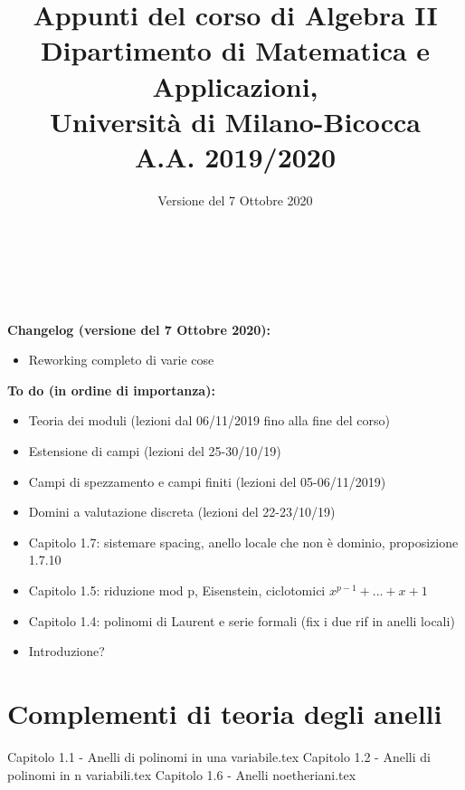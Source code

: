 \documentclass{article}
\begin{document}
\AddToShipoutPicture*{\BackgroundPic}

\title{\Huge{\textbf{Appunti del corso di Algebra II}} \\ \vspace{3mm}
	   \LARGE{\textbf{Dipartimento di Matematica e Applicazioni,}} \\ 
	   \LARGE{\textbf{Università di Milano-Bicocca}} \\ \vspace{3mm}
	   \Large{\textbf{A.A. 2019/2020}} %
	   }
\author{Versione del 7 Ottobre 2020}
\date{}

\maketitle
\thispagestyle{empty}
\clearpage

\tableofcontents

\

\

\noindent \textbf{Changelog (versione del 7 Ottobre 2020):}
\begin{itemize}
\item Reworking completo di varie cose
\end{itemize}

\noindent \textbf{To do (in ordine di importanza):}
\begin{itemize}
\item Teoria dei moduli (lezioni dal 06/11/2019 fino alla fine del corso)
\item Estensione di campi (lezioni del 25-30/10/19)
\item Campi di spezzamento e campi finiti (lezioni del 05-06/11/2019)
\item Domini a valutazione discreta (lezioni del 22-23/10/19)
\item Capitolo 1.7: sistemare spacing, anello locale che non è dominio, proposizione 1.7.10
\item Capitolo 1.5: riduzione mod p, Eisenstein, ciclotomici $x^{p-1}+...+x+1$
\item Capitolo 1.4: polinomi di Laurent e serie formali (fix i due rif in anelli locali)
\item Introduzione?
\end{itemize}
\clearpage

\section{Complementi di teoria degli anelli}
{Capitolo 1.1 - Anelli di polinomi in una variabile.tex}
{Capitolo 1.2 - Anelli di polinomi in n variabili.tex}
{Capitolo 1.6 - Anelli noetheriani.tex}
\end{document}
